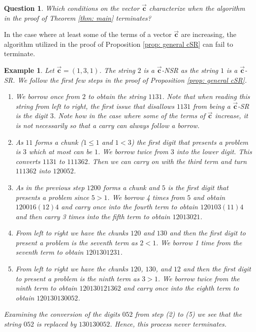 \documentclass[]{interact}
\newcommand{\vtr}[1]{\vec{\mathbf{#1}}}
\theoremstyle{plain}
\numberwithin{equation}{section} %
\newtheorem{example}[thm]{Example}
\newtheorem{question}[thm]{Question}
\numberwithin{table}{section} %
\numberwithin{figure}{section}
\begin{document}
\begin{question}\label{Qu:c conditions}
    Which conditions on the vector $\vtr{c}$ characterize when the algorithm in the proof of Theorem \textcolor{blue}{\ref{thm: main}} terminates?
\end{question}

In the case where at least some of the terms of a vector $\vtr{c}$ are increasing, the algorithm utilized in the proof of Proposition \textcolor{blue}{\ref{prop: general cSR}} can fail to terminate.

\begin{example}\label{Ex: Bad Algorthm}
    Let $\vtr{c}=(1,3,1)$. The string $2$ is a $\vtr{c}$-NSR as the string $1$ is a $\vtr{c}$-SR. We follow the first few steps in the proof of Proposition \textcolor{blue}{\ref{prop: general cSR}}.

    \begin{enumerate}
        \item We borrow once from $2$ to obtain the string $1131$. Note that when reading this string from left to right, the first issue that disallows $1131$ from being a $\vtr{c}$-SR is the digit $3$. Note how in the case where some of the terms of $\vtr{c}$ increase, it is not necessarily so that a carry can always follow a borrow. 
        \item As $11$ forms a chunk ($1\leq 1$ and $1<3$) the first digit that presents a problem is $3$ which at most can be $1$. We borrow twice from $3$ into the lower digit. This converts $1131$ to $111362$. Then we can carry on with the third term and turn $111362$ into $120052$.
        \item As in the previous step $1200$ forms a chunk and $5$ is the first digit that presents a problem since $5>1$. We borrow 4 times from $5$ and obtain $120016(12)4$ and carry once into the fourth term to obtain $120103(11)4$ and then carry 3 times into the fifth term to obtain $12013021$.
        \item From left to right we have the chunks $120$ and $130$ and then the first digit to present a problem is the seventh term as $2<1$. We borrow 1 time from the seventh term to obtain $1201301231$.
        \item From left to right we have the chunks $120$, $130$, and $12$ and then the first digit to present a problem is the ninth term as $3>1$. We borrow twice from the ninth term to obtain $120130121362$ and carry once into the eighth term to obtain $120130130052$.
    \end{enumerate}

Examining the conversion of the digits $052$ from step (2) to (5) we see that the string $052$ is replaced by $130130052$. Hence, this process never terminates.
    
\end{example}
\end{document}
